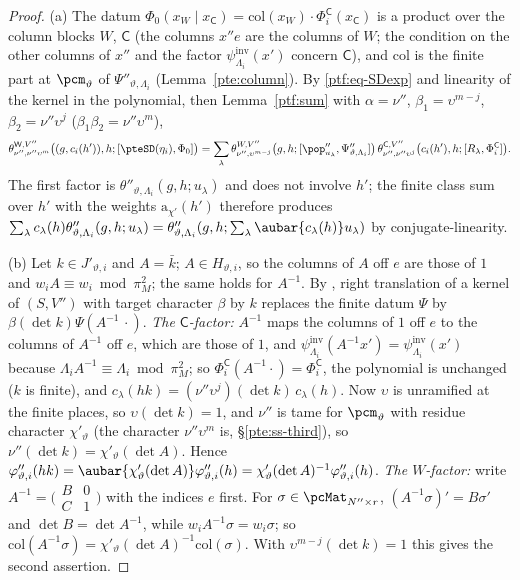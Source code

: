 \documentclass[10pt]{amsart}
\theoremstyle{definition}
\theoremstyle{remark}
\newcommand{\C}{\mathbb C}
\begin{document}
\begin{proof}
(a) The datum $\Phi_0(x_W\mid x_{\mathsf C})=\mathrm{col}(x_W)\cdot\Phi^{\mathsf C}_i(x_{\mathsf C})$ is a product over the
column blocks $W$, $\mathsf C$ (the columns $x''e$ are the columns of $W$; the condition on the other columns
of $x''$ and the factor $\psi^{\mathrm{inv}}_{\Lambda_i}(x')$ concern $\mathsf C$), and $\mathrm{col}$ is the finite part at
$\pcm_\vartheta$ of $\Psi''_{\vartheta,\Lambda_i}$ (Lemma~\ref{pte:column}). By \eqref{ptf:eq-SDexp} and linearity of the
kernel in the polynomial, then Lemma~\ref{ptf:sum} with $\alpha=\nu''$, $\beta_1=\upsilon^{m-j}$, $\beta_2=\nu''\upsilon^j$
($\beta_1\beta_2=\nu''\upsilon^m$),
\[
\theta^{\mathsf W,V''}_{\nu'',\nu''\upsilon^m}\bigl((g,c_i(h')),h;[\pteSD(\eta_i),\Phi_0]\bigr)=\sum_\lambda\theta^{W,V''}_{\nu'',\upsilon^{m-j}}
\bigl(g,h;[\pop''_{u_\lambda},\Psi''_{\vartheta,\Lambda_i}]\bigr)\,\theta^{\mathsf C,V''}_{\nu'',\nu''\upsilon^j}\bigl(c_i(h'),h;[R_\lambda,
\Phi^{\mathsf C}_i]\bigr).
\]
The first factor is $\theta''_{\vartheta,\Lambda_i}(g,h;u_\lambda)$ and does not involve $h'$; the finite class sum over
$h'$ with the weights $\mathrm a_{\chi'}(h')$ therefore produces $\sum_\lambda c_\lambda(h)\theta''_{\vartheta,\Lambda_i}(g,h;u_\lambda)=
\theta''_{\vartheta,\Lambda_i}(g,h;\sum_\lambda\aubar{c_\lambda(h)}u_\lambda)$ by conjugate-linearity.

(b) Let $k\in J'_{\vartheta,i}$ and $A=\bar k$; $A\in H_{\vartheta,i}$, so the columns of $A$ off $e$ are those of
$1$ and $w_iA\equiv w_i\bmod\pi_M^2$; the same holds for $A^{-1}$. By {\cite[Lemma~2.9]{P53}}, right translation
of a kernel of $(S,V'')$ with target character $\beta$ by $k$ replaces the finite datum $\Psi$ by $\beta(\det
k)\Psi(A^{-1}\,\cdot)$. \emph{The $\mathsf C$-factor:} $A^{-1}$ maps the columns of $1$ off $e$ to the columns of
$A^{-1}$ off $e$, which are those of $1$, and $\psi^{\mathrm{inv}}_{\Lambda_i}(A^{-1}x')=\psi^{\mathrm{inv}}_{\Lambda_i}(x')$ because
$\Lambda_iA^{-1}\equiv\Lambda_i\bmod\pi_M^2$; so $\Phi^{\mathsf C}_i(A^{-1}\cdot)=\Phi^{\mathsf C}_i$, the polynomial is unchanged ($k$ is
finite), and $c_\lambda(hk)=(\nu''\upsilon^j)(\det k)\,c_\lambda(h)$. Now $\upsilon$ is unramified at the finite places, so
$\upsilon(\det k)=1$, and $\nu''$ is tame for $\pcm_\vartheta$ with residue character $\chi'_\vartheta$ (the character
$\nu''\upsilon^m$ is, \S\ref{pte:ss-third}), so $\nu''(\det k)=\chi'_\vartheta(\det A)$. Hence $\varphi''_{\vartheta,i}(hk)=
\aubar{\chi'_\vartheta(\det A)}\varphi''_{\vartheta,i}(h)=\chi'_\vartheta(\det A)^{-1}\varphi''_{\vartheta,i}(h)$. \emph{The $W$-factor:}
write $A^{-1}=\bigl(\begin{smallmatrix}B&0\\C&1\end{smallmatrix}\bigr)$ with the indices $e$ first. For $\sigma\in\pcMat_{N''\times
r}$, $(A^{-1}\sigma)'=B\sigma'$ and $\det B=\det A^{-1}$, while $w_iA^{-1}\sigma=w_i\sigma$; so $\mathrm{col}(A^{-1}\sigma)=\chi'_\vartheta
(\det A)^{-1}\mathrm{col}(\sigma)$. With $\upsilon^{m-j}(\det k)=1$ this gives the second assertion. 


\end{proof}
\end{document}

